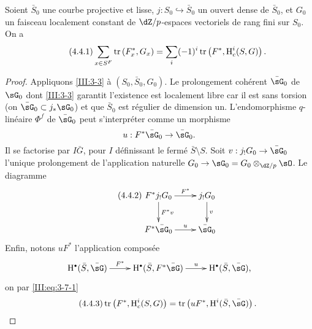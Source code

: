 \begin{theorem_}\label{III:4-1bis}
Soient $\bar S_0$ une courbe projective et lisse, 
$j:S_0\hookrightarrow \bar S_0$ un ouvert dense de $\bar S_0$, et $G_0$ un 
faisceau localement constant de $\dZ/p$-espaces vectoriels de rang fini sur 
$S_0$. On a 
\begin{equation*}\tag{4.4.1}\label{III:eq:4-4-1}
  \sum_{x\in S^F} \operatorname{tr}\left(F_x^*,G_x\right) = \sum_i (-1)^i \operatorname{tr}\left(F^*,\operatorname{H}_c^i(S,G)\right) \text{.}
\end{equation*}
\end{theorem_}
\begin{proof}
Appliquons \ref{III:3-3} à $(S_0,\bar S_0,G_0)$. Le prolongement cohérent 
$\bar\sG_0$ de $\sG_0$ dont \ref{III:3-3} garantit l'existence est localement 
libre car il est sans torsion (on  $\bar\sG_0\subset j_*\sG_0$) et que 
$\bar S_0$  est régulier de dimension un. L'endomorphisme $q$-linéaire 
$\Phi^f$ de $\bar\sG_0$ peut s'interpréter comme un morphisme 
\[
  u : F^*\bar\sG_0 \to \bar\sG_0 \text{.}
\]
Il se factorise par $I\bar G$, pour $I$ définissant le fermé 
$\bar S\setminus S$. Soit $v:j_!G_0 \to \bar\sG_0$ l'unique prolongement de 
l'application naturelle $G_0 \to \sG_0 = G_0\otimes_{\dZ/p}\sO$. Le diagramme 
\begin{equation*}\tag{4.4.2}\label{III:eq:4-4-2}
\xymatrix{
  F^* j_! G_0 \ar[r]^-{F^*} \ar[d]^-{F^* v} 
    & j_! G_0 \ar[d]^-v \\
  F^*\bar \sG_0 \ar[r]^-u 
    & \bar\sG_0
}
\end{equation*}
Enfin, notons $u F^*$ l'application composée 
\[\xymatrix{
  \h^\bullet(\bar S,\bar\sG) \ar[r]^-{F^*} 
    & \h^\bullet(\bar S,F^*\bar\sG) \ar[r]^-u 
    & \h^\bullet(\bar S,\bar\sG) \text{,}
}\]
on par \eqref{III:eq:3-7-1}
\begin{equation*}\tag{4.4.3}\label{III:eq:4-4-3}
  \tr\left(F^*,\h_c^i(S,G)\right) = \tr\left(u F^*,\h^i(\bar S,\bar\sG)\right) \text{.}
\end{equation*}


\end{proof}
